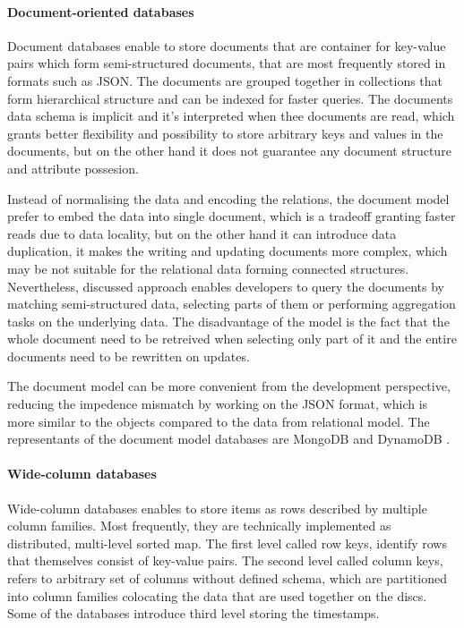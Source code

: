\paragraph*{Document-oriented databases}

Document databases enable to store documents that are container for key-value pairs which form semi-structured documents, that are most frequently stored in formats such as JSON. The documents are grouped together in collections that form hierarchical structure and can be indexed for faster queries. The documents data schema is implicit and it's interpreted when thee documents are read, which grants better flexibility and possibility to store arbitrary keys and values in the documents, but on the other hand it does not guarantee any document structure and attribute possesion.

Instead of normalising the data and encoding the relations, the document model prefer to embed the data into single document, which is a tradeoff granting faster reads due to data locality, but on the other hand it can introduce data duplication, it makes the writing and updating documents more complex, which may be not suitable for the relational data forming connected structures. Nevertheless, discussed approach enables developers to query the documents by matching semi-structured data, selecting parts of them or performing aggregation tasks on the underlying data. 
The disadvantage of the model is the fact that the whole document need to be retreived when selecting only part of it and the entire documents need to be rewritten on updates.

The document model can be more convenient from the development perspective, reducing the impedence mismatch by working on the JSON format, which is more similar to the objects compared to the data from relational model. The representants of the document model databases are MongoDB and DynamoDB \cite{DesignDataIntensiveApplications}.

\paragraph*{Wide-column databases}

Wide-column databases enables to store items as rows described by multiple column families. Most frequently, they are technically implemented as distributed, multi-level sorted map. The first level called row keys, identify rows that themselves consist of key-value pairs. The second level called column keys, refers to arbitrary set of columns without defined schema, which are partitioned into column families colocating the data that are used together on the discs. Some of the databases introduce third level storing the timestamps. 

